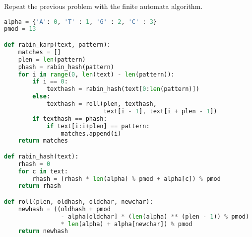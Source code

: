\documentclass[12pt]{article}
\newenvironment{problem}[2][Problem]{\begin{trivlist}
\item[\hskip \labelsep {\bfseries #1}\hskip \labelsep {\bfseries #2.}]}{\end{trivlist}}
\begin{document}
\pagebreak
\begin{problem}{3} %
    Repeat the previous problem with the finite automata algorithm.
\begin{lstlisting}[language=Python, caption=Rabin-Karp algorithm]
alpha = {'A': 0, 'T' : 1, 'G' : 2, 'C' : 3}
pmod = 13

def rabin_karp(text, pattern):
    matches = []
    plen = len(pattern)
    phash = rabin_hash(pattern)
    for i in range(0, len(text) - len(pattern)):
        if i == 0:
            texthash = rabin_hash(text[0:len(pattern)])
        else:
            texthash = roll(plen, texthash, 
                            text[i - 1], text[i + plen - 1])
        if texthash == phash:
            if text[i:i+plen] == pattern:
                matches.append(i)
    return matches

def rabin_hash(text):
    rhash = 0
    for c in text:
        rhash = (rhash * len(alpha) % pmod + alpha[c]) % pmod
    return rhash

def roll(plen, oldhash, oldchar, newchar):
    newhash = ((oldhash + pmod 
                - alpha[oldchar] * (len(alpha) ** (plen - 1)) % pmod) 
                * len(alpha) + alpha[newchar]) % pmod
    return newhash
\end{lstlisting}


\end{problem}
\end{document}
